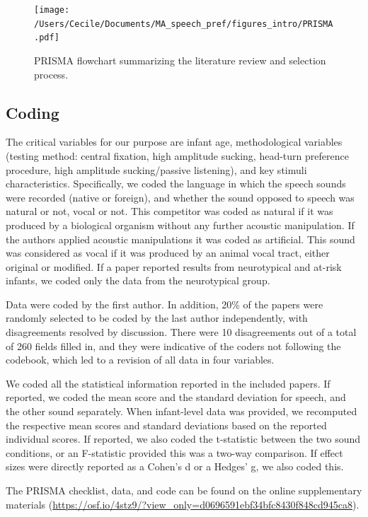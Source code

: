 \documentclass[man]{apa6}
\begin{document}
\begin{figure}
\centering
\texttt{[image: /Users/Cecile/Documents/MA\_speech\_pref/figures\_intro/PRISMA.pdf]}
\caption{\label{fig:unnamed-chunk-3}PRISMA flowchart summarizing the
literature review and selection process.}
\end{figure}

\subsection{Coding}\label{coding}

The critical variables for our purpose are infant age, methodological
variables (testing method: central fixation, high amplitude sucking,
head-turn preference procedure, high amplitude sucking/passive
listening), and key stimuli characteristics. Specifically, we coded the
language in which the speech sounds were recorded (native or foreign),
and whether the sound opposed to speech was natural or not, vocal or
not. This competitor was coded as natural if it was produced by a
biological organism without any further acoustic manipulation. If the
authors applied acoustic manipulations it was coded as artificial. This
sound was considered as vocal if it was produced by an animal vocal
tract, either original or modified. If a paper reported results from
neurotypical and at-risk infants, we coded only the data from the
neurotypical group.

Data were coded by the first author. In addition, 20\% of the papers
were randomly selected to be coded by the last author independently,
with disagreements resolved by discussion. There were 10 disagreements
out of a total of 260 fields filled in, and they were indicative of the
coders not following the codebook, which led to a revision of all data
in four variables.

We coded all the statistical information reported in the included
papers. If reported, we coded the mean score and the standard deviation
for speech, and the other sound separately. When infant-level data was
provided, we recomputed the respective mean scores and standard
deviations based on the reported individual scores. If reported, we also
coded the t-statistic between the two sound conditions, or an
F-statistic provided this was a two-way comparison. If effect sizes were
directly reported as a Cohen's d or a Hedges' g, we also coded this.

The PRISMA checklist, data, and code can be found on the online
supplementary materials
(\url{https://osf.io/4stz9/?view_only=d0696591ebf34bfc8430f848cd945ca8}).
\end{document}
